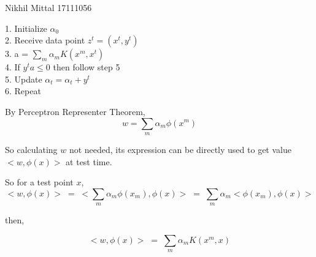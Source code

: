 \documentclass[a4paper,11pt]{article}
\begin{document}
								{Nikhil Mittal}      						           		%
								{17111056}																		%

\begin{mlsolution}
\end{mlsolution}

\begin{mlsolution}
\end{mlsolution}

\begin{mlsolution}
\begin{mlalgorithm}


1. Initialize $\alpha_{0}$\\

2. Receive data point $z^{t} = (x^{t}, y^{t})$ \\

3. a = $\sum_{m} \alpha_{m} K( x^{m}, x^{t})$\\

4. If {$y^{t}a \leq 0$} then follow step 5\\

5. Update $\alpha_{t} = \alpha_{t} + y^{t}$\\

6. Repeat

\end{mlalgorithm}

By Perceptron Representer Theorem, 
\[
    w = \sum_{m} \alpha_{m} \phi(x^{m})
\]

So calculating $w$ not needed, its expression can be directly used to get value $<w, \phi(x)>$ at test time.

So for a test point $x$,
\[
<w, \phi(x)> \;= \;< \sum_{m} \alpha_{m} \phi(x_{m}), \phi(x)>\;
            = \;\sum_{m} \alpha_{m} < \phi(x_{m}), \phi(x) >
\]

then,

\[
<w, \phi(x)> \;= \;\sum_{m} \alpha_{m} K( x^{m}, x)
\]

\end{mlsolution}
\end{document}

